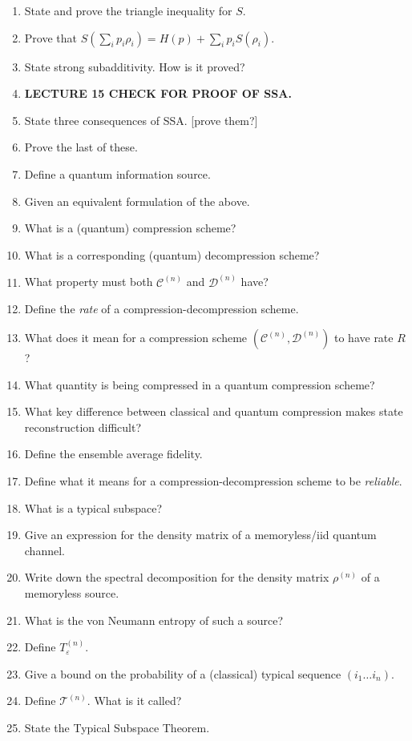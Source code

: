 \documentclass{article}
\newcommand{\mc}[1]{\mathcal{#1}}
\newcommand{\C}{\mc{C}}
\newcommand{\D}{\mc{D}}
\newcommand{\T}{\mc{T}}
\newcommand{\eps}{\varepsilon}
\begin{document}
\begin{enumerate}
    \item State and prove the triangle inequality for $S$.
    \item Prove that $S(\sum_i p_i \rho_i) = H(p) + \sum_i p_i S(\rho_i)$.
    \item State strong subadditivity. How is it proved?
    \item \textbf{LECTURE 15 CHECK FOR PROOF OF SSA.}
    \item State three consequences of SSA. [prove them?]
    \item Prove the last of these.
    \item Define a quantum information source.
    \item Given an equivalent formulation of the above.
    \item What is a (quantum) compression scheme?
    \item What is a corresponding (quantum) decompression scheme?
    \item What property must both $\mc{C}^{(n)}$ and $\mc{D}^{(n)}$ have?
    \item Define the \textit{rate} of a compression-decompression scheme.
    \item What does it mean for a compression scheme $(\C^{(n)},\D^{(n)})$ to have rate $R$?
    \item What quantity is being compressed in a quantum compression scheme?
    \item What key difference between classical and quantum compression makes state reconstruction difficult?
    \item Define the ensemble average fidelity.
    \item Define what it means for a compression-decompression scheme to be \textit{reliable}.
    \item What is a typical subspace?
    \item Give an expression for the density matrix of a memoryless/iid quantum channel.
    \item Write down the spectral decomposition for the density matrix $\rho^{(n)}$ of a memoryless source.
    \item What is the von Neumann entropy of such a source?
    \item Define $T_\eps^(n)$.
    \item Give a bound on the probability of a (classical) typical sequence $(i_1\dots i_n)$.
    \item Define $\T^{(n)}$. What is it called?
    \item State the Typical Subspace Theorem.

\end{enumerate}
\end{document}
